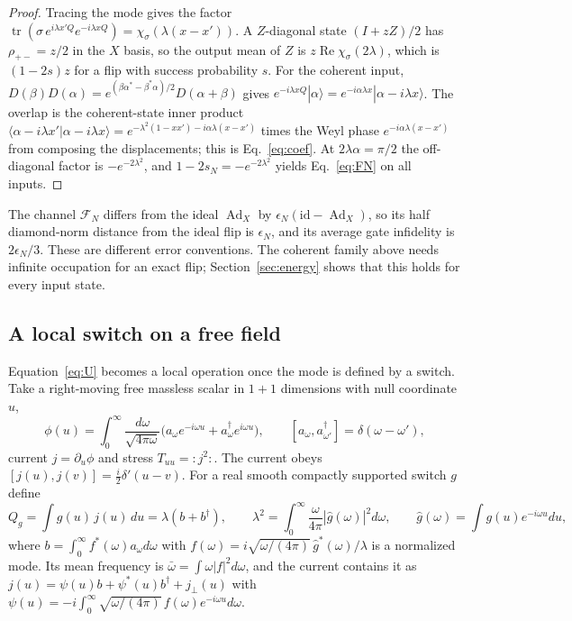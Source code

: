 \documentclass[aps,pre,onecolumn,superscriptaddress,floatfix,longbibliography]{revtex4-2}
\begin{document}
\begin{proof}
Tracing the mode gives the factor $\operatorname{tr}(\sigma\,e^{i\lambda x'Q}e^{-i\lambda xQ})=\chi_\sigma(\lambda(x-x'))$. A $Z$-diagonal state $(I+zZ)/2$ has $\rho_{+-}=z/2$ in the $X$ basis, so the output mean of $Z$ is $z\operatorname{Re}\chi_\sigma(2\lambda)$, which is $(1-2s)z$ for a flip with success probability $s$. For the coherent input, $D(\beta)D(\alpha)=e^{(\beta\alpha^*-\beta^*\alpha)/2}D(\alpha+\beta)$ gives $e^{-i\lambda xQ}|\alpha\rangle=e^{-i\alpha\lambda x}|\alpha-i\lambda x\rangle$. The overlap is the coherent-state inner product $\langle\alpha-i\lambda x'|\alpha-i\lambda x\rangle=e^{-\lambda^2(1-xx')-i\alpha\lambda(x-x')}$ times the Weyl phase $e^{-i\alpha\lambda(x-x')}$ from composing the displacements; this is Eq.~\eqref{eq:coef}. At $2\lambda\alpha=\pi/2$ the off-diagonal factor is $-e^{-2\lambda^2}$, and $1-2s_N=-e^{-2\lambda^2}$ yields Eq.~\eqref{eq:FN} on all inputs.
\end{proof}

The channel $\mathcal F_N$ differs from the ideal $\operatorname{Ad}_X$ by $\epsilon_N(\mathrm{id}-\operatorname{Ad}_X)$, so its half diamond-norm distance from the ideal flip is $\epsilon_N$, and its average gate infidelity is $2\epsilon_N/3$. These are different error conventions. The coherent family above needs infinite occupation for an exact flip; Section~\ref{sec:energy} shows that this holds for every input state.

\subsection{A local switch on a free field}
\label{sec:switch}

Equation~\eqref{eq:U} becomes a local operation once the mode is defined by a switch. Take a right-moving free massless scalar in $1+1$ dimensions with null coordinate $u$,
\begin{equation}
\phi(u)=\int_0^\infty\frac{d\omega}{\sqrt{4\pi\omega}}\bigl(a_\omega e^{-i\omega u}+a_\omega^\dagger e^{i\omega u}\bigr),\qquad
[a_\omega,a_{\omega'}^\dagger]=\delta(\omega-\omega'),
\end{equation}
current $j=\partial_u\phi$ and stress $T_{uu}=:j^2:$. The current obeys $[j(u),j(v)]=\tfrac i2\delta'(u-v)$. For a real smooth compactly supported switch $g$ define
\begin{equation}
Q_g=\int g(u)\,j(u)\,du=\lambda(b+b^\dagger),\qquad
\lambda^2=\int_0^\infty\frac{\omega}{4\pi}|\hat g(\omega)|^2d\omega,\qquad
\hat g(\omega)=\int g(u)e^{-i\omega u}du,
\label{eq:Qg}
\end{equation}
where $b=\int_0^\infty f^*(\omega)a_\omega d\omega$ with $f(\omega)=i\sqrt{\omega/(4\pi)}\,\hat g^*(\omega)/\lambda$ is a normalized mode. Its mean frequency is $\bar\omega=\int\omega|f|^2d\omega$, and the current contains it as $j(u)=\psi(u)b+\psi^*(u)b^\dagger+j_\perp(u)$ with $\psi(u)=-i\int_0^\infty\sqrt{\omega/(4\pi)}\,f(\omega)e^{-i\omega u}d\omega$.
\end{document}
